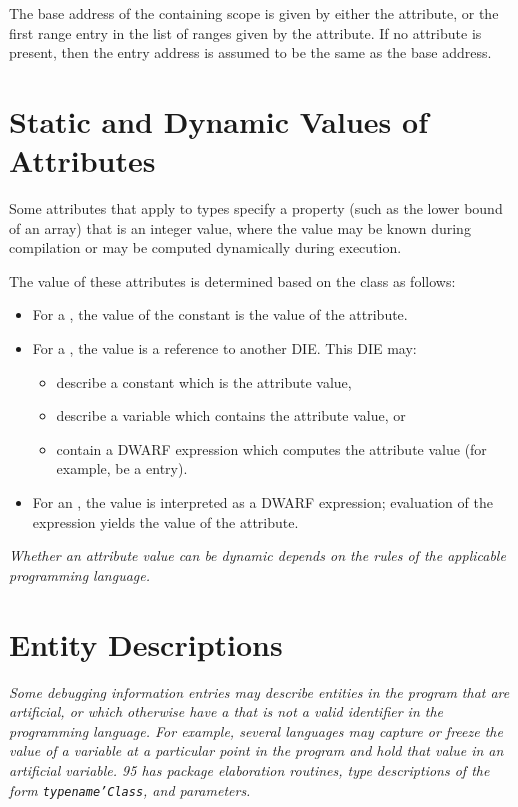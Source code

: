 The base address of the containing scope is given by either the
\DWATlowpc{} attribute, or the first range entry in the list of
ranges given by the \DWATranges{} attribute. 
If no \DWATentrypcNAME{} attribute is present,
then the entry address is assumed to be the same as the
base address.


\section{Static and Dynamic Values of Attributes}
\label{chap:staticanddynamicvaluesofattributes}

Some attributes that apply to types specify a property (such
as the lower bound of an array) that is an integer value,
where the value may be known during compilation or may be
computed dynamically during execution.

The value of these
attributes is determined based on the class as follows:
\begin{itemize}
\item For a , the value of the constant is the value of
the attribute.

\item For a , the
value is a reference to another DIE.  This DIE may:
\begin{itemize}
\renewcommand{\itemsep}{0cm}
\item describe a constant which is the attribute value,
\item describe a variable which contains the attribute value, or
\item contain a DWARF expression which computes the attribute value
      (for example, be a \DWTAGdwarfprocedure{} entry).
\end{itemize}

\item For an , the value is interpreted as a 
DWARF expression; 
evaluation of the expression yields the value of
the attribute.
\end{itemize}

\textit{Whether an attribute value can be dynamic depends on the
rules of the applicable programming language.
}

\section{Entity Descriptions}
\textit{Some debugging information entries may describe entities
in the program that are artificial, or which otherwise have a 
 that is not a valid identifier in the
programming language. For example, several languages may
capture or freeze the value of a variable at a particular
point in the program and hold that value in an artificial variable. 
 95 has package elaboration routines,
type descriptions of the form \texttt{typename\textquoteright Class}, and 
 parameters.}

